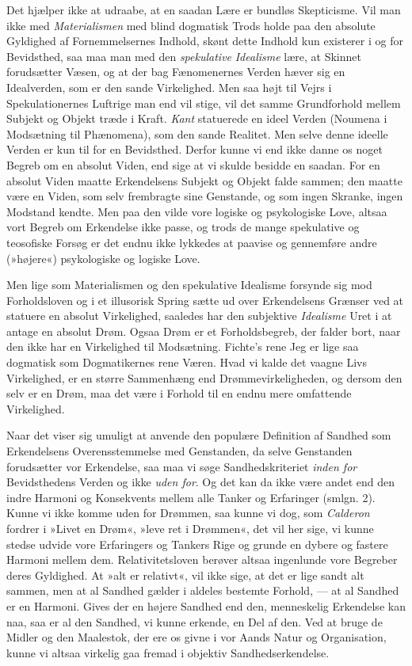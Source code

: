\documentclass[12pt,a4paper,openany]{book}
\newcommand{\opage}[1]{\marginnote{\footnotesize\textit{[#1]}}}
\begin{document}
Det hjælper ikke at udraabe, at en saadan Lære er bundløs Skepticisme.
Vil man ikke med \emph{Materialismen} med blind dogmatisk Trods holde
paa den absolute Gyldighed af Fornemmelsernes Indhold, skønt dette
Indhold kun existerer i og for Bevidsthed, saa maa man med den
\emph{spekulative}
\opage{266}\emph{Idealisme} lære, at Skinnet forudsætter Væsen, og at
der bag Fænomenernes Verden hæver sig en Idealverden, som er den sande
Virkelighed. Men saa højt til Vejrs i Spekulationernes Luftrige man end
vil stige, vil det samme Grundforhold mellem Subjekt og Objekt træde i
Kraft. \emph{Kant} statuerede en ideel Verden (Noumena i Modsætning til
Phænomena), som den sande Realitet. Men selve denne ideelle Verden er
kun til for en Bevidsthed. Derfor kunne vi end ikke danne os noget
Begreb om en absolut Viden, end sige at vi skulde besidde en saadan. For
en absolut Viden maatte Erkendelsens Subjekt og Objekt falde sammen; den
maatte være en Viden, som selv frembragte sine Genstande, og som ingen
Skranke, ingen Modstand kendte. Men paa den vilde vore logiske og
psykologiske Love, altsaa vort Begreb om Erkendelse ikke passe, og trods
de mange spekulative og teosofiske Forsøg er det endnu ikke lykkedes at
paavise og gennemføre andre (»højere«) psykologiske og logiske Love.

Men lige som Materialismen og den spekulative Idealisme forsynde sig mod
Forholdsloven og i et illusorisk Spring sætte ud over Erkendelsens
Grænser ved at statuere en absolut Virkelighed, saaledes har den
subjektive \emph{Idealisme} Uret i at antage en absolut Drøm. Ogsaa Drøm
er et Forholdsbegreb, der falder bort, naar den ikke har en Virkelighed
til Modsætning. Fichte’s rene Jeg er lige saa dogmatisk som
Dogmatikernes rene Væren. Hvad vi kalde det vaagne Livs Virkelighed, er
en større Sammenhæng end Drømmevirkeligheden, og dersom den selv er en
Drøm, maa det være i Forhold til en endnu mere omfattende Virkelighed.

Naar det viser sig umuligt at anvende den populære Definition af Sandhed
som Erkendelsens Overensstemmelse med Genstanden, da selve Genstanden
forudsætter vor Erkendelse, saa maa vi søge Sandhedskriteriet
\emph{inden for} Bevidsthedens Verden og ikke \emph{uden for}. Og det
kan da ikke være andet end den indre Harmoni og Konsekvents mellem alle
Tanker og Erfaringer (smlgn. 2). Kunne vi ikke komme uden for Drømmen,
saa kunne vi dog, som \emph{Calderon} fordrer i »Livet en Drøm«, »leve
ret i Drømmen«, det vil her sige, vi kunne stedse udvide vore
Erfaringers og Tankers Rige og grunde en dybere
\opage{267}og fastere Harmoni mellem dem. Relativitetsloven berøver
altsaa ingenlunde vore Begreber deres Gyldighed. At »alt er relativt«,
vil ikke sige, at det er lige sandt alt sammen, men at al Sandhed gælder
i aldeles bestemte Forhold, --- at al Sandhed er en Harmoni. Gives der
en højere Sandhed end den, menneskelig Erkendelse kan naa, saa er al den
Sandhed, vi kunne erkende, en Del af den. Ved at bruge de Midler og den
Maalestok, der ere os givne i vor Aands Natur og Organisation, kunne vi
altsaa virkelig gaa fremad i objektiv Sandhedserkendelse.
\end{document}
